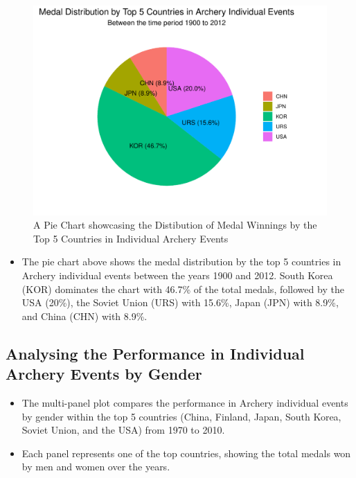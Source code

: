\documentclass[
  12pt,
]{elsarticle}
\providecommand{\tightlist}{%
  \setlength{\itemsep}{0pt}\setlength{\parskip}{0pt}}
\begin{document}
\begin{figure}

{\centering \includegraphics{README_files/figure-latex/unnamed-chunk-5-1} 

}

\caption{A Pie Chart showcasing the Distibution of Medal Winnings by the Top 5 Countries in Individual Archery Events\label{Figure5}}\label{fig:unnamed-chunk-5}
\end{figure}

\begin{itemize}
\tightlist
\item
  The pie chart above shows the medal distribution by the top 5
  countries in Archery individual events between the years 1900 and
  2012. South Korea (KOR) dominates the chart with 46.7\% of the total
  medals, followed by the USA (20\%), the Soviet Union (URS) with
  15.6\%, Japan (JPN) with 8.9\%, and China (CHN) with 8.9\%.
\end{itemize}

\hypertarget{analysing-the-performance-in-individual-archery-events-by-gender}{%
\subsection{Analysing the Performance in Individual Archery Events by
Gender}\label{analysing-the-performance-in-individual-archery-events-by-gender}}

\begin{itemize}
\item
  The multi-panel plot compares the performance in Archery individual
  events by gender within the top 5 countries (China, Finland, Japan,
  South Korea, Soviet Union, and the USA) from 1970 to 2010.
\item
  Each panel represents one of the top countries, showing the total
  medals won by men and women over the years.
\end{itemize}
\end{document}
